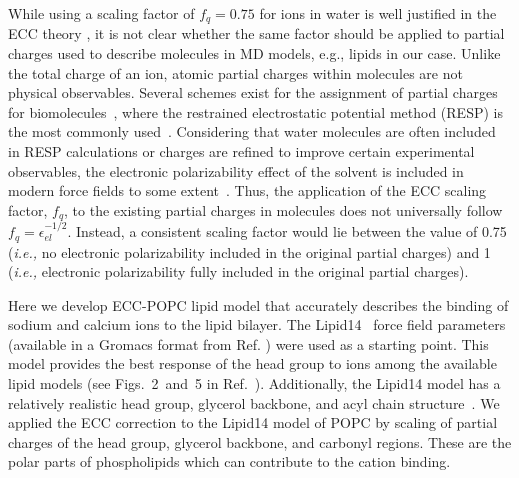 \documentclass[aip,jcp,twocolumn]{revtex4}
\begin{document}
While using a scaling factor of $f_q = 0.75$ for ions in water is well justified in the ECC theory \cite{Leontyev2011}, it is not clear whether the same factor should be applied to partial charges used to describe molecules in MD models, e.g., lipids in our case. Unlike the total charge of an ion, atomic partial charges within molecules are not physical observables. Several schemes exist for the assignment of partial charges for biomolecules~\cite{Hu2007}, where the restrained electrostatic potential method (RESP) is the most commonly used~\cite{RESP_paper, Singh1984}. Considering that water molecules are often included in RESP calculations or charges are refined to improve certain experimental observables, the electronic polarizability effect of the solvent is included in modern force fields to some extent~\cite{RESP_paper, Singh1984, jorgensen96, ipolq2013, benavides17}. Thus, the application of the ECC scaling factor, $f_q$, to the existing partial charges in molecules does not universally follow $f_q = \epsilon _{el} ^{-1/2}$. Instead, a consistent scaling factor would lie between the value of 0.75  (\textit{i.e.,} no electronic polarizability included in the original partial charges) and 1 (\textit{i.e.,} electronic polarizability fully included in the original partial charges). 

Here we develop ECC-POPC lipid model that accurately describes the binding 
of sodium and calcium ions to the lipid bilayer. 
The Lipid14~\cite{dickson14} force field parameters 
(available in a Gromacs format from Ref. ) were used as a starting 
point. 
This model provides the best response of the head group to ions among the available 
lipid models (see Figs.~2~and~5 in Ref.~). Additionally, the Lipid14 model 
has a relatively realistic head group, glycerol backbone, and acyl chain structure~\cite{dickson14,botan15}.
We applied the ECC correction 
to the Lipid14 model of POPC by scaling of 
partial charges of the head group, glycerol 
backbone, and carbonyl regions. 
These are the polar parts of phospholipids which can 
contribute to the cation binding. 
\end{document}
